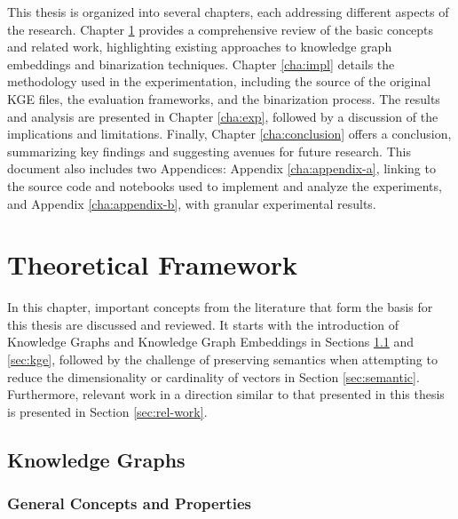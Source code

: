 \documentclass[11pt,titlepage,oneside,openany]{book}
\begin{document}
This thesis is organized into several chapters, each addressing different aspects of the research. Chapter \ref{cha:theory} provides a comprehensive review of the basic concepts and related work, highlighting existing approaches to knowledge graph embeddings and binarization techniques. Chapter \ref{cha:impl} details the methodology used in the experimentation, including the source of the original KGE files, the evaluation frameworks, and the binarization process. The results and analysis are presented in Chapter \ref{cha:exp}, followed by a discussion of the implications and limitations. Finally, Chapter \ref{cha:conclusion} offers a conclusion, summarizing key findings and suggesting avenues for future research. This document also includes two Appendices: Appendix \ref{cha:appendix-a}, linking to the source code and notebooks used to implement and analyze the experiments, and Appendix \ref{cha:appendix-b}, with granular experimental results.


\chapter{Theoretical Framework}
\label{cha:theory}

In this chapter, important concepts from the literature that form the basis for this thesis are discussed and reviewed. It starts with the introduction of Knowledge Graphs and Knowledge Graph Embeddings in Sections \ref{sec:kg} and \ref{sec:kge}, followed by the challenge of preserving semantics when attempting to reduce the dimensionality or cardinality of vectors in Section \ref{sec:semantic}. Furthermore, relevant work in a direction similar to that presented in this thesis is presented in Section \ref{sec:rel-work}.

\section{Knowledge Graphs}
\label{sec:kg}

\subsection{General Concepts and Properties}
\label{subsec:kg-concepts}
\end{document}
